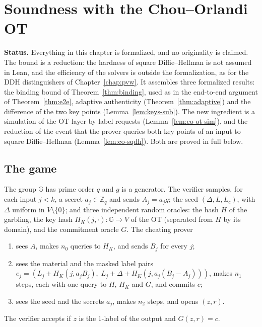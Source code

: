 \chapter{Soundness with the Chou--Orlandi OT}
\label{chap:co-soundness}

\textbf{Status.} Everything in this chapter is formalized, and no originality is claimed. The
bound is a reduction: the hardness of square Diffie--Hellman is not assumed in Lean, and the
efficiency of the solvers is outside the formalization, as for the DDH distinguishers of
Chapter~\ref{chap:pvw}. It assembles three formalized results: the binding bound of
Theorem~\ref{thm:binding}, used as in the end-to-end argument of Theorem~\ref{thm:e2e}, adaptive
authenticity (Theorem~\ref{thm:adaptive}) and the difference of the two key points
(Lemma~\ref{lem:keys-sub}). The new ingredient is a simulation of the OT
layer by label requests (Lemma~\ref{lem:co-ot-sim}), and the reduction of the event that the
prover queries both key points of an input to square Diffie--Hellman (Lemma~\ref{lem:co-sqdh}).
Both are proved in full below.

\section{The game}

\begin{definition}
  \label{def:co-game}
  \leanok
  The group $\mathbb{G}$ has prime order $q$ and $g$ is a generator. The verifier samples, for each input
  $j < k$, a secret $a_j \in \mathbb{Z}_q$ and sends $A_j = a_j
  g$; the seed $(\Delta, L, L_c)$, with $\Delta$ uniform in $V \setminus \{0\}$; and three
  independent random oracles: the hash $H$ of the
  garbling, the key hash $H_K(j, \cdot) : \mathbb{G} \to V$ of the OT (separated from $H$ by its domain), and
  the commitment oracle $G$. The cheating prover
  \begin{enumerate}
    \item sees $A$, makes $n_0$ queries to $H_K$, and sends $B_j$ for every $j$;
    \item sees the material and the masked label pairs $e_j = (L_j + H_K(j, a_j B_j),\; L_j + \Delta
    + H_K(j, a_j(B_j - A_j)))$, makes $n_1$ steps, each with one query to $H$, $H_K$ and $G$, and
    commits $c$;
    \item sees the seed and the secrets $a_j$, makes $n_2$ steps, and opens $(z, r)$.
  \end{enumerate}
  The verifier accepts if $z$ is the $1$-label of the output and $G(z, r) = c$.
\end{definition}


